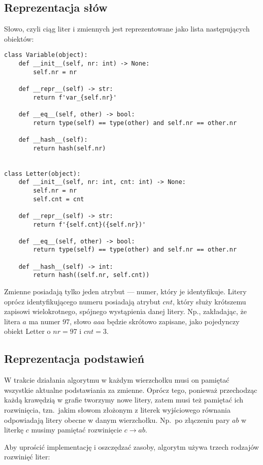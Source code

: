 \documentclass[leqno, 12pt]{article}
\begin{document}
\subsection{Reprezentacja słów}
Słowo, czyli ciąg liter i zmiennych jest reprezentowane jako lista następujących obiektów:
\begin{verbatim}
class Variable(object):
    def __init__(self, nr: int) -> None:
        self.nr = nr

    def __repr__(self) -> str:
        return f'var_{self.nr}'

    def __eq__(self, other) -> bool:
        return type(self) == type(other) and self.nr == other.nr
    
    def __hash__(self):
        return hash(self.nr)


class Letter(object):
    def __init__(self, nr: int, cnt: int) -> None:
        self.nr = nr
        self.cnt = cnt

    def __repr__(self) -> str:
        return f'{self.cnt}({self.nr})'

    def __eq__(self, other) -> bool:
        return type(self) == type(other) and self.nr == other.nr

    def __hash__(self) -> int:
        return hash((self.nr, self.cnt))
\end{verbatim}
Zmienne posiadają tylko jeden atrybut --- numer, który je identyfikuje. Litery oprócz identyfikującego numeru posiadają atrybut $cnt$, który służy krótszemu zapisowi wielokrotnego, spójnego wystąpienia danej litery. Np., zakładając, że litera $a$ ma numer $97$, słowo $aaa$ będzie skrótowo zapisane, jako pojedynczy obiekt Letter o $nr = 97$ i $cnt = 3$.


\subsection{Reprezentacja podstawień}
W trakcie działania algorytmu w każdym wierzchołku musi on pamiętać wszystkie aktualne podstawiania za zmienne. Oprócz tego, ponieważ przechodząc każdą krawędzią w grafie tworzymy nowe litery, zatem musi też pamiętać ich rozwinięcia, tzn.\ jakim słowom złożonym z literek wyjściowego równania odpowiadają litery obecne w danym wierzchołku. Np.\ po złączeniu pary $ab$ w literkę $c$ musimy pamiętać rozwinięcie $c \rightarrow ab$.

Aby uprościć implementację i oszczędzać zasoby, algorytm używa trzech rodzajów rozwinięć liter:
\end{document}
